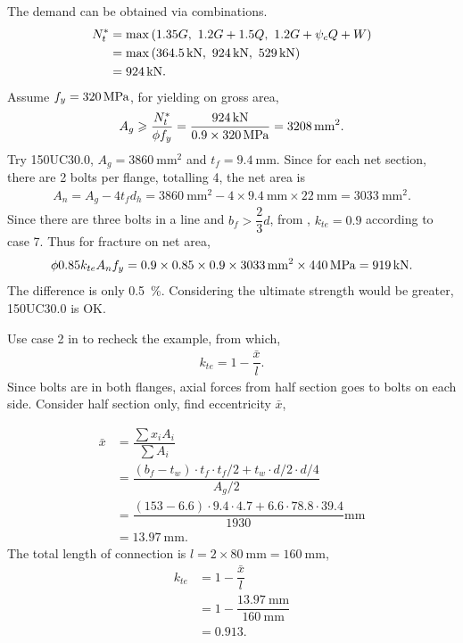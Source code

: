 \begin{solution}
The demand can be obtained via combinations.
\begin{align*}
N^*_t&=\max\left(1.35G,~1.2G+1.5Q,~1.2G+\psi_cQ+W\right)\\
&=\max\left(\SI{364.5}{\kilo\newton},~\SI{924}{\kilo\newton},~\SI{529}{\kilo\newton}\right)\\
&=\SI{924}{\kilo\newton}.
\end{align*}
Assume $f_y=\SI{320}{\mega\pascal}$, for yielding on gross area,
\begin{gather*}
A_g\geqslant\dfrac{N^*_t}{\phi{}f_y}=\dfrac{\SI{924}{\kilo\newton}}{0.9\times\SI{320}{\mega\pascal}}=\SI{3208}{\milli\meter^2}.
\end{gather*}
Try 150UC30.0, $A_g=\SI{3860}{\mm^2}$ and $t_f=\SI{9.4}{\mm}$. Since for each net section, there are 2 bolts per flange, totalling 4, the net area is
\begin{gather*}
A_n=A_g-4t_fd_h=\SI{3860}{\mm^2}-4\times\SI{9.4}{\mm}\times\SI{22}{\mm}=\SI{3033}{\mm^2}.
\end{gather*}
Since there are three bolts in a line and $b_f>\dfrac{2}{3}d$, from , $k_{te}=0.9$ according to case 7. Thus for fracture on net area,
\begin{gather*}
\phi0.85k_{te}A_nf_y=0.9\times0.85\times0.9\times\SI{3033}{\milli\meter^2}\times\SI{440}{\mega\pascal}=\SI{919}{\kilo\newton}.
\end{gather*}
The difference is only \SI{0.5}{\percent}. Considering the ultimate strength would be greater, 150UC30.0 is OK.

Use case 2 in  to recheck the example, from which,
\begin{gather*}
k_{te}=1-\dfrac{\bar{x}}{l}.
\end{gather*}
Since bolts are in both flanges, axial forces from half section goes to bolts on each side. Consider half section only, find eccentricity $\bar{x}$,

\begin{minipage}{6cm}
\centering
\end{minipage}
\begin{minipage}{.99\linewidth-6cm}
\begin{align*}
\bar{x}&=\dfrac{\sum{}x_iA_i}{\sum{}A_i}\\&=\dfrac{\left(b_f-t_w\right)\cdot{}t_f\cdot{}t_f/2+t_w\cdot{}d/2\cdot{}d/4}{A_g/2}\\
&=\dfrac{\left(153-6.6\right)\cdot{}9.4\cdot{}4.7+6.6\cdot{}78.8\cdot{}39.4}{1930}\si{\mm}\\
&=\SI{13.97}{\mm}.
\end{align*}
The total length of connection is $l=2\times\SI{80}{\mm}=\SI{160}{\mm}$,
\begin{align*}
k_{te}&=1-\dfrac{\bar{x}}{l}\\
&=1-\dfrac{\SI{13.97}{\mm}}{\SI{160}{\mm}}\\
&=0.913.
\end{align*}
\end{minipage}


\end{solution}
